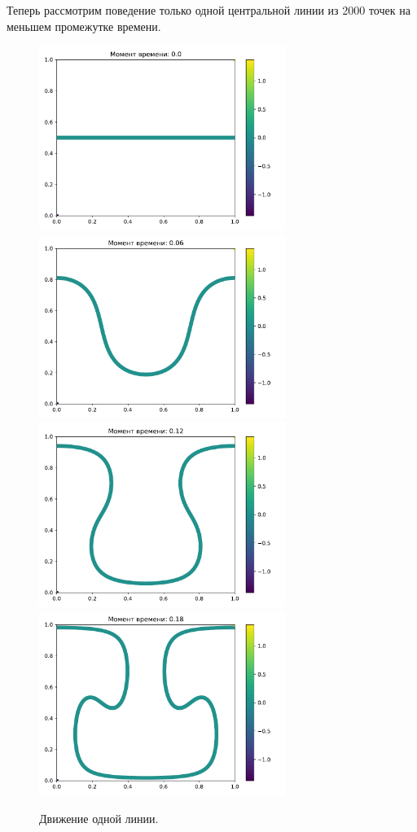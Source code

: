         Теперь рассмотрим поведение только одной центральной линии из 2000 точек на меньшем промежутке времени.  
        \begin{figure}[H]
            \centering
            \includegraphics[width=8cm]{pictures/line0.pdf}
            \includegraphics[width=8cm]{pictures/line3.pdf}
            \includegraphics[width=8cm]{pictures/line6.pdf}
            \includegraphics[width=8cm]{pictures/line9.pdf}
            \caption{Движение одной линии.} \label{line}
        \end{figure}

